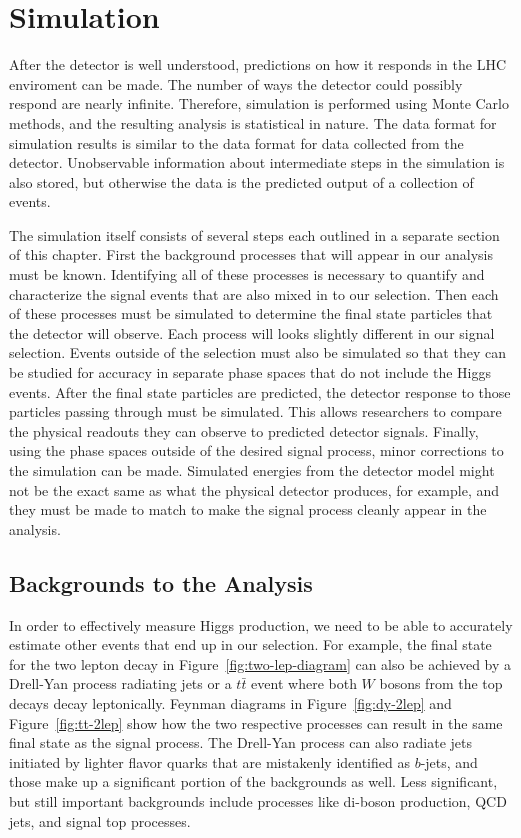 \chapter{Simulation} \label{ch:simulation}

After the detector is well understood,
predictions on how it responds in the LHC enviroment can be made.
The number of ways the detector could possibly respond are nearly infinite.
Therefore, simulation is performed using Monte Carlo methods,
and the resulting analysis is statistical in nature.
The data format for simulation results is similar to the data format for
data collected from the detector.
Unobservable information about intermediate steps
in the simulation is also stored,
but otherwise the data is the predicted output of a collection of events.

The simulation itself consists of several steps
each outlined in a separate section of this chapter.
First the background processes that will appear in our analysis must be known.
Identifying all of these processes is necessary to quantify and characterize
the signal events that are also mixed in to our selection.
Then each of these processes must be simulated to determine the final state particles
that the detector will observe.
Each process will looks slightly different in our signal selection.
Events outside of the selection must also be simulated so that they can be studied
for accuracy in separate phase spaces that do not include the Higgs events.
After the final state particles are predicted,
the detector response to those particles passing through must be simulated.
This allows researchers to compare the physical readouts
they can observe to predicted detector signals.
Finally, using the phase spaces outside of the desired signal process,
minor corrections to the simulation can be made.
Simulated energies from the detector model might not be the exact same as
what the physical detector produces, for example,
and they must be made to match to make the signal process cleanly appear in the analysis.

\section{Backgrounds to the Analysis}

In order to effectively measure Higgs production,
we need to be able to accurately estimate other events
that end up in our selection.
For example, the final state for the two lepton decay in Figure~\ref{fig:two-lep-diagram}
can also be achieved by a Drell-Yan process radiating jets
or a $t\bar{t}$ event where both $W$ bosons from the top decays decay leptonically.
Feynman diagrams in Figure~\ref{fig:dy-2lep} and Figure~\ref{fig:tt-2lep}
show how the two respective processes can result in
the same final state as the signal process.
The Drell-Yan process can also radiate jets initiated by lighter flavor quarks
that are mistakenly identified as $b$-jets,
and those make up a significant portion of the backgrounds as well.
Less significant, but still important backgrounds include processes like
di-boson production, QCD jets, and signal top processes.

